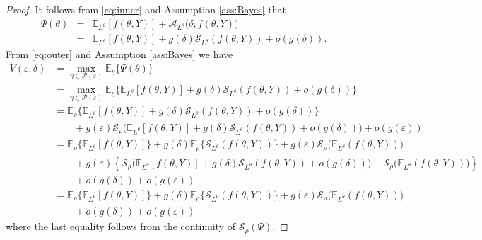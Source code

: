 \documentclass[10pt,a4paper]{amsart}
\numberwithin{equation}{section}
\numberwithin{theorem}{section}
\numberwithin{table}{section}
\numberwithin{figure}{section}
\begin{document}
\begin{proof}
It follows from \eqref{eq:inner} and Assumption \ref{ass:Bayes} that
\begin{eqnarray*}
\Psi(\theta)  &= &   {\mathbb E}_{L^\theta}[f(\theta, Y)]  + {\mathcal A}_{L^\theta}\big(\delta; f(\theta, Y)\big) \\ & = & {\mathbb E}_{L^\theta}[f(\theta, Y)]  + g(\delta) {\mathcal S}_{L^\theta}(f(\theta, Y))+ o(g(\delta)).
\end{eqnarray*}
From \eqref{eq:outer} and Assumption \ref{ass:Bayes} we have
\begin{align*}
V(\varepsilon, \delta) & =  \max_{\eta \in {\mathcal P}(\varepsilon)} {\mathbb E}_\eta \big\{\Psi(\theta) \big\} \\[8pt] 
& = \max_{\eta \in {\mathcal P}(\varepsilon)} {\mathbb E}_\eta\Big\{{\mathbb E}_{L^\theta}[f(\theta, Y)]  + g(\delta) {\mathcal S}_{L^\theta}(f(\theta, Y))+ o(g(\delta))\Big\} \\[8pt]
& = {\mathbb E}_\rho\Big\{{\mathbb E}_{L^\theta}[f(\theta, Y)]+ g(\delta) {\mathcal S}_{L^\theta}(f(\theta, Y))+ o(g(\delta)) \Big\} \\[8pt]
& \qquad + g(\varepsilon){\mathcal S}_\rho\Big({\mathbb E}_{L^\theta}[f(\theta, Y)]  + g(\delta) {\mathcal S}_{L^\theta}(f(\theta, Y))+ o(g(\delta))\Big) + o(g(\varepsilon)) \\[8pt]
& = {\mathbb E}_\rho\Big\{{\mathbb E}_{L^\theta}[f(\theta, Y)] \Big\} + g(\delta){\mathbb E}_\rho\Big\{{\mathcal S}_{L^\theta}(f(\theta, Y))\Big\}  +  g(\varepsilon) {\mathcal S}_\rho\Big({\mathbb E}_{L^\theta}(f(\theta, Y))\Big) \\[8pt]
& \qquad + g(\varepsilon) \left\{{\mathcal S}_\rho\Big({\mathbb E}_{L^\theta}[f(\theta, Y)]  + g(\delta) {\mathcal S}_{L^\theta}(f(\theta, Y)) + o(g(\delta)) \Big) - {\mathcal S}_\rho\Big({\mathbb E}_{L^\theta}(f(\theta, Y))\Big)\right\}  
\\[8pt]
& 
\qquad + o(g(\delta)) + o(g({\varepsilon})) \\[8pt]
& = {\mathbb E}_\rho\Big\{{\mathbb E}_{L^\theta}[f(\theta, Y)] \Big\} + g(\delta){\mathbb E}_\rho\Big\{{\mathcal S}_{L^\theta}(f(\theta, Y))\Big\}  +  g(\varepsilon) {\mathcal S}_\rho\Big({\mathbb E}_{L^\theta}(f(\theta, Y))\Big) \\[8pt] 
& \qquad + o(g(\delta)) + o(g({\varepsilon}))
\end{align*}
where the last equality follows from the continuity of ${\mathcal S}_\rho(\Psi)$.
\end{proof}
\end{document}
